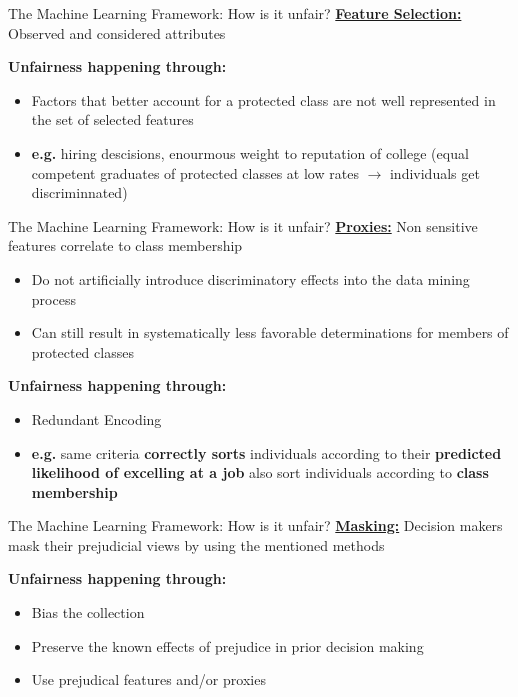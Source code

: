 \begin{frame}{The Machine Learning Framework: How is it unfair? \cite{Barocas.2016}}
    \underline{\textbf{Feature Selection:}} Observed and considered attributes \newline 
    
    \begin{block}{\textbf{Unfairness happening through:}}
    \begin{itemize}
        \item Factors that better account for a protected class are not well represented in the set of selected features 
        \item \textbf{e.g.} hiring descisions, enourmous weight to reputation of college (equal competent graduates of protected classes at low rates $\rightarrow$ individuals get discriminnated)
    \end{itemize}
        \end{block}
\end{frame}

\begin{frame}{The Machine Learning Framework: How is it unfair? \cite{Barocas.2016}}
    \underline{\textbf{Proxies:}} Non sensitive features correlate to class membership
    \begin{itemize}
        \item Do not artificially introduce discriminatory effects into the data mining process
        \item Can still result in systematically less favorable determinations for members of protected classes
    \end{itemize} 

    \begin{block}{\textbf{Unfairness happening through:}}
    \begin{itemize}
        \item  Redundant Encoding
        \item \textbf{e.g.} same criteria \textbf{correctly sorts} individuals according to their \textbf{predicted likelihood of excelling at a job} also sort individuals according to \textbf{class membership}
    \end{itemize}
        \end{block}
\end{frame}

\begin{frame}{The Machine Learning Framework: How is it unfair? \cite{Barocas.2016}}
    \underline{\textbf{Masking:}} Decision makers mask their prejudicial views by using the mentioned methods \newline 
    
    \begin{block}{\textbf{Unfairness happening through:}}
    \begin{itemize}
        \item Bias the collection
        \item Preserve the known effects of prejudice in prior decision making
        \item Use prejudical features and/or proxies
    \end{itemize}
        \end{block}
\end{frame}